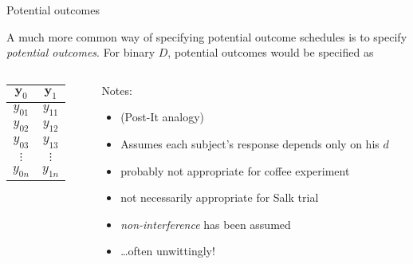 \begin{frame}{Potential outcomes}
  
A much more common way of specifying potential outcome schedules is to specify \textit{potential outcomes}.  For binary $D$, potential outcomes would be specified as

\begin{columns}
\begin{Column}
    \begin{tabular}{cc} \hline
 $\mathbf{y}_0$ & $\mathbf{y}_1$ \\ \hline
$y_{01}$ & $y_{11}$  \\
$y_{02}$ & $y_{12}$  \\
$y_{03}$ & $y_{13}$  \\
$\vdots$ & $\vdots$  \\
$y_{0n}$ & $y_{1n}$  \\ \hline
    \end{tabular}
\pause
\end{Column}

\begin{Column}
Notes:\\

\begin{itemize}[<+->]
\item (Post-It analogy)
\item Assumes each subject's response depends only on his $d$
\item probably not appropriate for coffee experiment
\item not necessarily appropriate for Salk trial
\item \textit{non-interference} has been assumed
\item \ldots often unwittingly!
\end{itemize}
  
\end{Column}
\end{columns}

\end{frame}

